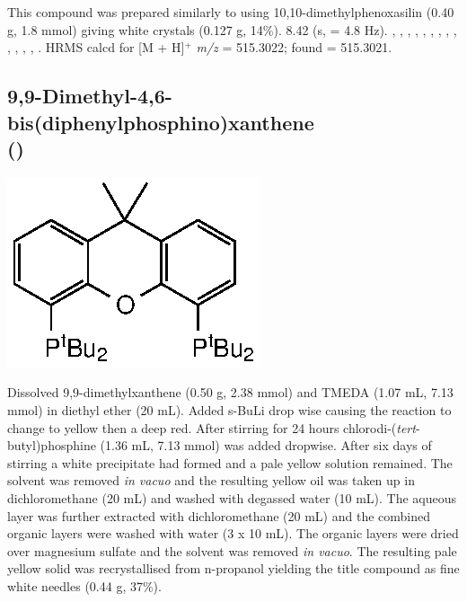 This compound was prepared similarly to  using 10,10-dimethylphenoxasilin (0.40 g, 1.8 mmol) giving white crystals (0.127 g, 14\%).
8.42 (s,  = 4.8 Hz).
,
,
,
,
,
,
,
,
,
,
,
,
,
.
HRMS calcd for  [M + H]$^+$ \emph{m/z} = 515.3022; found = 515.3021.



\subsection*{9,9-Dimethyl-4,6-bis(diphenylphosphino)xanthene \\(\tBuxantphos)}

\begin{structure}[h]
\begin{center}
\includegraphics{../Structures/CtBuligand.eps}
\end{center}
\end{structure}

Dissolved 9,9-dimethylxanthene (0.50 g, 2.38 mmol) and \gls{TMEDA} (1.07 mL, 7.13 mmol) in diethyl ether (20 mL).  Added s-BuLi drop wise causing the reaction to change to yellow then a deep red.  After stirring for 24 hours chlorodi-(\emph{tert}-butyl)phosphine (1.36 mL, 7.13 mmol) was added dropwise.  After six days of stirring a white precipitate had formed and a pale yellow solution remained.  The solvent was removed \emph{in vacuo} and the resulting yellow oil was taken up in dichloromethane (20 mL) and washed with degassed water (10 mL).  The aqueous layer was further extracted with dichloromethane (20 mL) and the combined organic layers were washed with water (3 x 10 mL).  The organic layers were dried over magnesium sulfate and the solvent was removed \emph{in vacuo}.  The resulting pale yellow solid was recrystallised from n-propanol yielding the title compound as fine white needles (0.44 g, 37\%).

